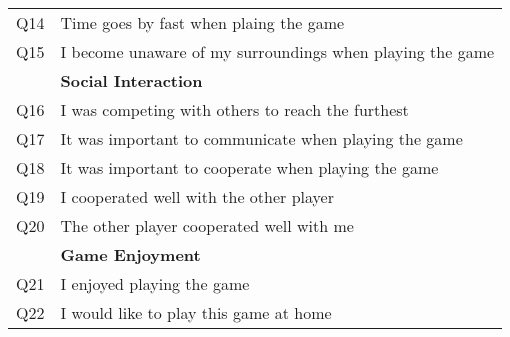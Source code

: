\begin{table}[!ht]
\begin{tabular}{|l|l|}
		Q14         & Time goes by fast when plaing the game                         \\
		Q15         & I become unaware of my surroundings when playing the game      \\ \hline
					& \textbf{Social Interaction}                                    \\ \hline
		Q16         & I was competing with others to reach the furthest              \\
		Q17         & It was important to communicate when playing the game          \\
		Q18         & It was important to cooperate when playing the game            \\
		Q19         & I cooperated well with the other player                        \\
		Q20         & The other player cooperated well with me                       \\ \hline
					& \textbf{Game Enjoyment}                                        \\ \hline
		Q21         & I enjoyed playing the game                                     \\
		Q22         & I would like to play this game at home                         \\ \hline
	\end{tabular}
\end{table}
